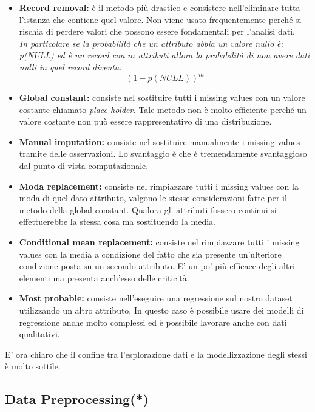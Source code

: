 \begin{itemize}
	\item \textbf{Record removal:} è il metodo più drastico e consistere nell'eliminare tutta l'istanza che contiene quel valore. Non viene usato frequentemente perché si rischia di perdere valori che possono essere fondamentali per l'analisi dati. \\ \textit{In particolare se la probabilità che un attributo abbia un valore nullo è: p(NULL) ed è un record con $m$ attributi allora la probabilità di non avere dati nulli in quel record diventa: 
		\[(1-p(NULL))^m\]}
	
	\item \textbf{Global constant:} consiste nel sostituire tutti i missing values con un valore costante chiamato \textit{place holder.} Tale metodo non è molto efficiente perché un valore costante non può essere rappresentativo di una distribuzione.
	
	\item \textbf{Manual imputation:} consiste nel sostituire manualmente i missing values tramite delle osservazioni. Lo svantaggio è che è tremendamente svantaggioso dal punto di vista computazionale.
	\item  \textbf{Moda replacement:} consiste nel rimpiazzare tutti i missing values con la moda di quel dato attributo, valgono le stesse considerazioni fatte per il metodo della global constant. Qualora gli attributi fossero continui si effettuerebbe la stessa cosa ma sostituendo la media.
	\item \textbf{Conditional mean replacement:} consiste nel rimpiazzare tutti i missing values con la media a condizione del fatto che sia presente un'ulteriore condizione posta su un secondo attributo. E' un po' più efficace degli altri elementi ma presenta anch'esso delle criticità.
	
	\item \textbf{Most probable:} consiste nell'eseguire una regressione sul nostro dataset utilizzando un altro attributo. In questo caso è possibile usare dei modelli di regressione anche molto complessi ed è possibile lavorare anche con dati qualitativi.
\end{itemize}

E' ora chiaro che il confine tra l'esplorazione dati e la modellizzazione degli stessi è molto sottile.

\subsection{Data Preprocessing(*)}

